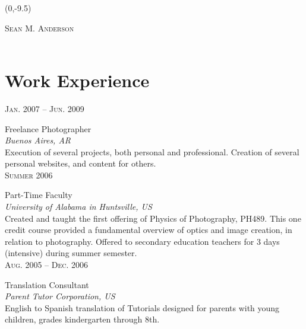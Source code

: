 \documentclass[letterpaper,10pt]{article}
\begin{document}
\begin{textblock}{1}(0,-9.5)
\end{textblock}

\centering
{\Huge \textsc{Sean M. Anderson}}\\	
{\Large\color{headings}\\[20pt]}
	
\begin{minipage}[t]{0.5\textwidth} %

	\vspace{0pt}	%
	
\section{Work Experience}
	\raggedleft
	\textsc{\normalsize Jan. 2007 -- Jun. 2009}\\
	\raggedright{\large Freelance Photographer\\
	\emph{Buenos Aires, AR}}\\[5pt]
	\normalsize{Execution of several projects, both personal and professional. Creation of several personal websites, and content for others.}\\[10pt]

	\raggedleft
	\textsc{\normalsize Summer 2006}\\
	\raggedright{\large Part-Time Faculty\\
	\emph{University of Alabama in Huntsville, US}}\\[5pt]
	\normalsize{Created and taught the first offering of Physics of Photography, PH489. This one credit course provided a fundamental overview of optics and image creation, in relation to photography. Offered to secondary education teachers for 3 days (intensive) during summer semester.}\\[10pt]

	\raggedleft
	\textsc{\normalsize Aug. 2005 -- Dec. 2006}\\
	\raggedright{\large Translation Consultant\\
	\emph{Parent Tutor Corporation, US}}\\[5pt]
	\normalsize{English to Spanish translation of Tutorials designed for parents with young children, grades kindergarten through 8th.}\\[10pt]


\end{minipage}
\end{document}
